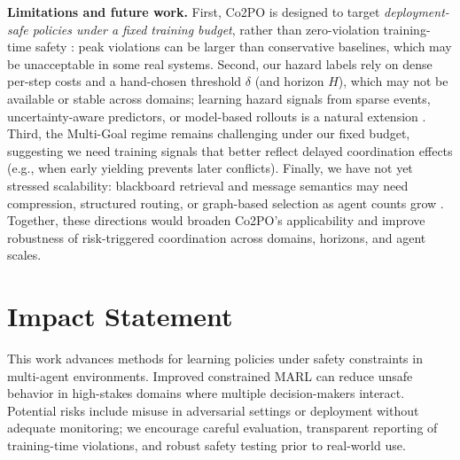 \documentclass{article}
\theoremstyle{plain}
\theoremstyle{definition}
\theoremstyle{remark}
\begin{document}
\textbf{Limitations and future work.}
First, Co2PO is designed to target \emph{deployment-safe policies under a fixed training budget}, rather than zero-violation training-time safety \cite{alshiekh2017safereinforcementlearningshielding, berkenkamp2017safemodelbasedreinforcementlearning}: peak violations can be larger than conservative baselines, which may be unacceptable in some real systems.
Second, our hazard labels rely on dense per-step costs and a hand-chosen threshold $\delta$ (and horizon $H$), which may not be available or stable across domains; learning hazard signals from sparse events, uncertainty-aware predictors, or model-based rollouts is a natural extension \cite{yang2020meanfieldmultiagentreinforcement, calzolari2026safeheterogeneousmultiagentrl}. Third, the Multi-Goal regime remains challenging under our fixed budget, suggesting we need training signals that better reflect delayed coordination effects (e.g., when early yielding prevents later conflicts). Finally, we have not yet stressed scalability: blackboard retrieval and message semantics may need compression, structured routing, or graph-based selection as agent counts grow \cite{goeckner2024graphbasedmar}. Together, these directions would broaden Co2PO’s applicability and improve robustness of risk-triggered coordination across domains, horizons, and agent scales.

\clearpage


\section*{Impact Statement}
This work advances methods for learning policies under safety constraints in multi-agent environments. Improved constrained MARL can reduce unsafe behavior in high-stakes domains where multiple decision-makers interact. Potential risks include misuse in adversarial settings or deployment without adequate monitoring; we encourage careful evaluation, transparent reporting of training-time violations, and robust safety testing prior to real-world use.
\end{document}

